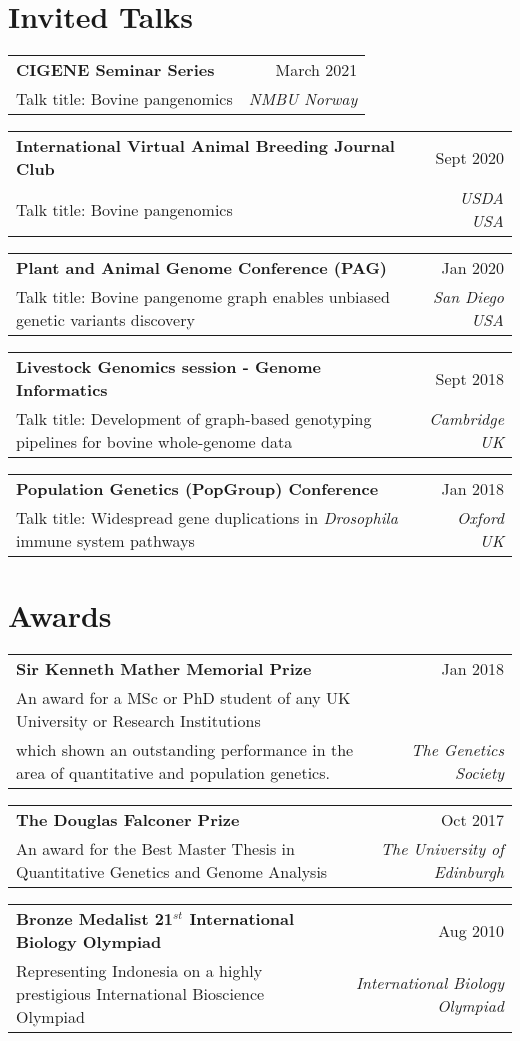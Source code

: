 \documentclass[letterpaper,10pt]{article}
\makeatletter
\newcommand{\resumetalk}[4]{\small{
  \vspace{-2pt}\item
    \begin{tabular*}{0.97\textwidth}[t]{l@{\extracolsep{\fill}}r}
      \textbf{#1} & #2 \\
      \small#3 & \textit{\small #4} \\
    \end{tabular*}\vspace{-4pt}
    }
}
\newcommand{\resumeSubHeadingListStart}{\begin{itemize}[leftmargin=0.15in, label={}]}
\newcommand{\resumeSubHeadingListEnd}{\end{itemize}}
\makeatother
\begin{document}
\section{Invited Talks}
   
 \resumeSubHeadingListStart
 \small{
 
    \resumetalk {CIGENE Seminar Series}{March 2021}
      {Talk title: Bovine pangenomics}{NMBU Norway}
      \resumetalk {International Virtual Animal Breeding Journal Club}{Sept 2020}
      {Talk title: Bovine pangenomics}{USDA USA}
   \resumetalk {Plant and Animal Genome Conference (PAG)}{Jan 2020}
      {Talk title: Bovine pangenome graph enables unbiased genetic variants discovery}{San Diego USA}
      
  \resumetalk {Livestock Genomics session - Genome Informatics}{Sept 2018}
     {Talk title: Development of graph-based genotyping pipelines for bovine whole-genome data}{Cambridge UK}
     
    \resumetalk {Population Genetics (PopGroup) Conference }{Jan 2018}
     {Talk title: Widespread gene duplications in \textit{Drosophila} immune system pathways}{Oxford UK}
     
      
    }
\resumeSubHeadingListEnd
    
\section{Awards}
   
 \resumeSubHeadingListStart
 \small{
 
    \resumetalk {Sir Kenneth Mather Memorial Prize}{Jan 2018}
      {An award for a MSc or PhD student of any UK University or Research Institutions \\ which shown an outstanding performance in the area of quantitative and population genetics. }{The Genetics Society}
    \resumetalk {The Douglas Falconer Prize }{Oct 2017}
      {An award for the Best Master Thesis in Quantitative Genetics and Genome Analysis}{The University of Edinburgh}
   \resumetalk {Bronze Medalist 21$^{st}$ International Biology Olympiad}{Aug 2010}
      {Representing Indonesia on a highly prestigious International Bioscience Olympiad}{International Biology Olympiad}}
\resumeSubHeadingListEnd
\end{document}
